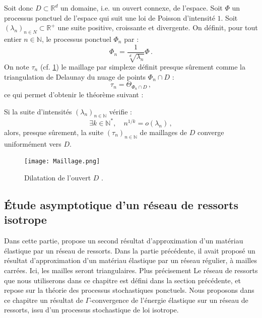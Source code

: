 \noindent Soit donc $D \subset \mathbb{R}^d$ un domaine, i.e. un ouvert connexe, de l’espace. Soit $\Phi$ un processus ponctuel de l’espace qui suit une loi de Poisson d’intensité $1$. Soit $(\lambda_n )_{n\in N} \subset \mathbb{R}^{+}$ une suite positive, croissante et divergente. On définit, pour tout entier $n \in \mathbb{N}$, le processus ponctuel $\Phi_n$ par :
$$
\Phi_n = \frac{1}{\sqrt[d]{\lambda_n}}\Phi \,.
$$
On note $\tau_n$ (cf. \cref{fig:maillage}) le maillage par simplexe définit presque sûrement comme la triangulation de Delaunay du nuage de points $\Phi_n \cap D$ :
$$\tau_n = \Theta_{\Phi_n \cap D} \,, $$
ce qui permet d'obtenir le théorème suivant :
\begin{theorem} \label{th:lambda}
    Si la suite d’intensités $(\lambda_n)_{n \in \mathbb{N}}$ vérifie :
    $$\exists k \in \mathbb{N}^\ast , \quad n^{1/k} = o(\lambda_n)\,,$$
    alors, presque sûrement, la suite $(\tau_n)_{n \in \mathbb{N}}$ de maillages de $D$ converge uniformément vers $D$.
\end{theorem}
\begin{figure}[H]
    \centering
    \texttt{[image: Maillage.png]}\
    \caption{Dilatation de l'ouvert $D$ \parencite[p.138]{balasoiu2020halthesis}.}
    \label{fig:maillage}
\end{figure}





\subsection{Étude asymptotique d’un réseau de ressorts isotrope} 

Dans cette partie, \citeauthor{balasoiu2020halthesis} propose un second résultat d’approximation d’un matériau
élastique par un réseau de ressorts. Dans la partie précédente, il avait proposé un résultat d’approximation d’un matériau élastique par un réseau régulier, à mailles carrées. Ici, les mailles seront triangulaires. Plus précisement Le réseau de ressorts que nous utiliserons dans ce chapitre est défini dans la section précédente, et repose sur la théorie des processus stochastiques ponctuels.
Nous proposons dans ce chapitre un résultat de $\Gamma$-convergence de l’énergie élastique sur un réseau de ressorts, issu d’un processus stochastique de loi isotrope. 


